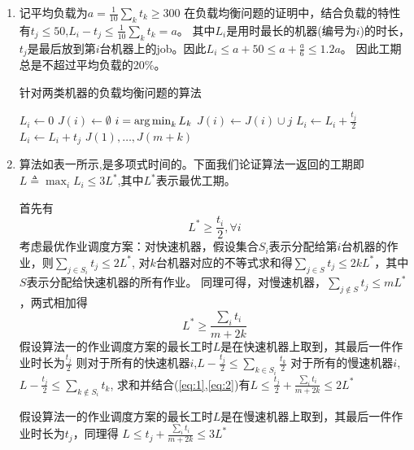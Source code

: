 \documentclass[a4paper]{article}
\begin{document}
\begin{enumerate}[label=\arabic*.]
  \setlength{\itemsep}{3\parskip}
  \setcounter{enumi}{4}
  \item 
     记平均负载为$a=\frac{1}{10}\sum_{k}t_k\geq 300$
     在负载均衡问题的证明中，结合负载的特性有$t_j\leq 50$,$L_i-t_j\leq \frac{1}{10}\sum_{k}t_k=a$。
     其中$L_i$是用时最长的机器(编号为$i$)的时长，$t_j$是最后放到第$i$台机器上的job。因此$L_i\leq a+50\leq a+ \frac{a}{6}\leq 1.2a$。
     因此工期总是不超过平均负载的20\%。
     
  
    \begin{algorithm}
    \caption{针对两类机器的负载均衡问题的算法}\label{alg}
    \begin{algorithmic}[1]
    \STATE $L_i \leftarrow 0$
    \STATE $J(i)\leftarrow \emptyset$
    \ENDFOR
    \STATE $i=\operatorname*{arg\,min}_k L_k$
    \STATE $J(i)\leftarrow J(i)\cup j$
    \STATE $L_i\leftarrow L_i+\frac{t_j}{2}$
    \ELSE
    \STATE $L_i\leftarrow L_i+t_j$    
    \ENDIF
    \ENDFOR
    \RETURN $J(1),\dots,J(m+k)$        
    \end{algorithmic}
    \end{algorithm}  
    \item 
    算法如表一所示,是多项式时间的。下面我们论证算法一返回的工期即$L\triangleq\max_i L_i \leq 3L^*$,其中$L^*$表示最优工期。
    
    首先有
    \begin{equation}\label{eq:1}
        L^*\geq \frac{t_i}{2},\forall i
    \end{equation}    
    考虑最优作业调度方案：对快速机器，假设集合$S_i$表示分配给第$i$台机器的作业，则$\sum_{j\in S_i} t_j \leq 2L^*$,
    对$k$台机器对应的不等式求和得$\sum_{j\in S} t_j \leq 2kL^*$，其中$S$表示分配给快速机器的所有作业。
    同理可得，对慢速机器，$\sum_{j\notin S} t_j \leq mL^*$，两式相加得
    \begin{equation}\label{eq:2}
        L^* \geq  \frac{\sum_i t_i}{m+2k}   
    \end{equation}
    假设算法一的作业调度方案的最长工时$L$是在快速机器上取到，其最后一件作业时长为$\frac{t_j}{2}$
    则对于所有的快速机器$i$,$L-\frac{t_j}{2}\leq \sum_{k \in S_i} \frac{t_k}{2}$
    对于所有的慢速机器$i$, $L-\frac{t_j}{2}\leq \sum_{k \not\in S_i} t_k$,
    求和并结合(\ref{eq:1},\ref{eq:2})有$L\leq  \frac{t_j}{2}+ \frac{\sum_i t_i}{m+2k} \leq 2L^*$
    
    假设算法一的作业调度方案的最长工时$L$是在慢速机器上取到，其最后一件作业时长为$t_j$，同理得
    $L\leq  t_j +\frac{\sum_i t_i}{m+2k} \leq 3L^*$


\end{enumerate}
\end{document}
